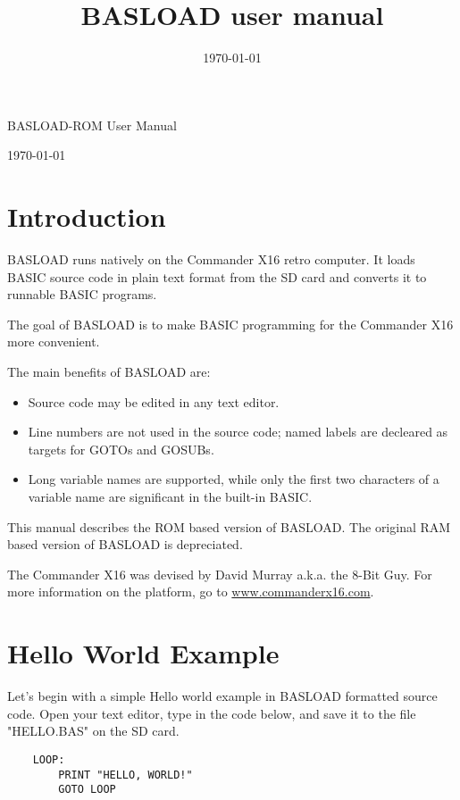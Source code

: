 \documentclass{article}
\title{BASLOAD user manual}
\date{\today}
\begin{document}
\begin{huge}
    BASLOAD-ROM User Manual
\end{huge}

\vspace{1em}
\today

\vspace{4em}
\tableofcontents
\vspace{4em}

\section{Introduction}

    BASLOAD runs natively on the Commander X16 retro computer. It loads BASIC 
    source code in plain text format from the SD card and converts it to 
    runnable BASIC programs.

    The goal of BASLOAD is to make BASIC programming for the Commander X16 more convenient.

    The main benefits of BASLOAD are:

    \begin{itemize}
        \item Source code may be edited in any text editor.
        \item Line numbers are not used in the source code; named labels are 
              decleared as targets for GOTOs and GOSUBs.
        \item Long variable names are supported, while only the first two 
              characters of a variable name are significant in the built-in 
              BASIC.
    \end{itemize}
    
    This manual describes the ROM based version of BASLOAD. The original RAM
    based version of BASLOAD is depreciated.

    The Commander X16 was devised by David Murray a.k.a. the 
    8-Bit Guy. For more information on the platform, go to 
    \href{http://www.commanderx16.com}{www.commanderx16.com}.

\section{Hello World Example}

    Let's begin with a simple Hello world example in BASLOAD formatted
    source code. Open your text editor, type in the code below, and save it to
    the file "HELLO.BAS" on the SD card.

    \begin{verbatim}
    LOOP:
        PRINT "HELLO, WORLD!"
        GOTO LOOP
    \end{verbatim}
\end{document}
